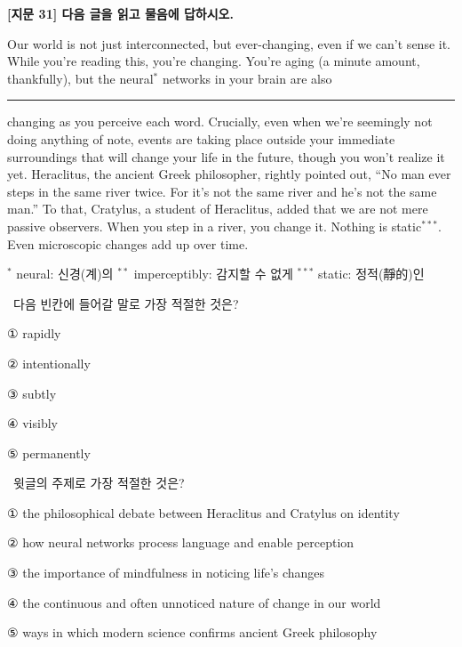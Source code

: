 \documentclass[11pt,a4paper]{article}
\newcommand{\qno}[1]{\par\vspace{8pt}\noindent{\sffamily\bfseries #1.}\ }
\newcommand{\instr}[1]{{\sffamily #1}\par\vspace{3pt}}
\begin{document}
\begin{center}
{\fontsize{15}{17}\selectfont\sffamily\bfseries [지문 31] 다음 글을 읽고 물음에 답하시오.}
\end{center}
\vspace{4pt}

\begin{pbox}
Our world is not just interconnected, but ever-changing, even if we can't sense it.
While you're reading this, you're changing.
You're aging (a minute amount, thankfully), but the neural$^{*}$ networks in your brain
are also \rule{3.5cm}{0.4pt} changing as you perceive each word.
Crucially, even when we're seemingly not doing anything of note, events are taking
place outside your immediate surroundings that will change your life in the future,
though you won't realize it yet.
Heraclitus, the ancient Greek philosopher, rightly pointed out, ``No man ever steps
in the same river twice. For it's not the same river and he's not the same man.''
To that, Cratylus, a student of Heraclitus, added that we are not mere passive observers.
When you step in a river, you change it.
Nothing is static$^{***}$.
Even microscopic changes add up over time.\par\vspace{4pt}
\noindent\footnotesize
$^{*}$ neural: 신경(계)의\quad
$^{**}$ imperceptibly: 감지할 수 없게\quad
$^{***}$ static: 정적(靜的)인
\end{pbox}

\qno{1}\instr{다음 빈칸에 들어갈 말로 가장 적절한 것은?}
\begin{choices}
\item ① rapidly
\item ② intentionally
\item ③ subtly
\item ④ visibly
\item ⑤ permanently
\end{choices}

\qno{2}\instr{윗글의 주제로 가장 적절한 것은?}
\begin{choices}
\item ① the philosophical debate between Heraclitus and Cratylus on identity
\item ② how neural networks process language and enable perception
\item ③ the importance of mindfulness in noticing life's changes
\item ④ the continuous and often unnoticed nature of change in our world
\item ⑤ ways in which modern science confirms ancient Greek philosophy
\end{choices}
\end{document}

